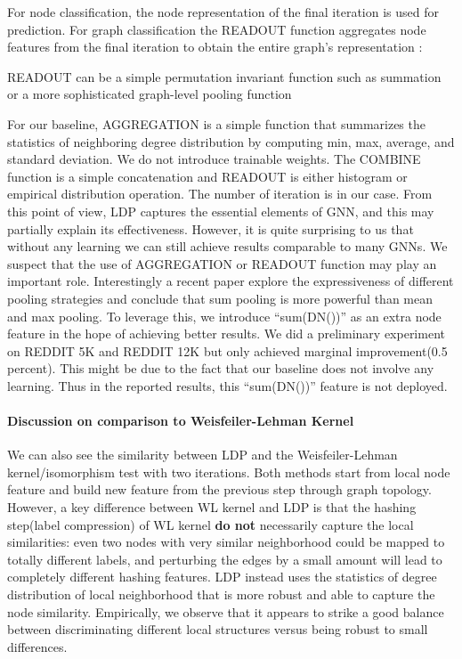 \documentclass[11pt,onecolumn]{article}
\newcommand{\DOM}       {{LDP}\xspace}
\begin{document}
For node classification, the node representation  of the final iteration is used for prediction. For graph classification the READOUT function aggregates node features from the final iteration to obtain the entire graph's representation : 

READOUT can be a simple permutation invariant function such as summation or a more sophisticated graph-level pooling function \cite{ying2018hierarchical, zhang2018end}

For our baseline, AGGREGATION is a simple function that summarizes the statistics of neighboring degree distribution by computing min, max, average, and standard deviation. We do not introduce trainable weights. The COMBINE function is a simple concatenation and READOUT is either histogram or empirical distribution operation. The number of iteration is  in our case. From this point of view, \DOM{} captures the essential elements of GNN, and this may partially explain its effectiveness. However, it is quite surprising to us that without any learning we can still achieve results comparable to many GNNs. We suspect that the use of AGGREGATION or READOUT function may play an important role. Interestingly a recent paper\cite{xu2018powerful} explore the expressiveness of different pooling strategies and conclude that sum pooling is more powerful than mean and max pooling. 
To leverage this, we introduce  ``sum(DN())'' as an extra node feature in the hope of achieving better results. We did a preliminary experiment on REDDIT 5K and REDDIT 12K but only achieved marginal improvement(0.5 percent). This might be due to the fact that our baseline does not involve any learning. Thus in the reported results, this ``sum(DN())'' feature is not deployed. 
 
\paragraph{Discussion on  comparison to Weisfeiler-Lehman Kernel}
We can also see the similarity between \DOM{} and the Weisfeiler-Lehman kernel/isomorphism test with two iterations.  Both methods start from local node feature and build new feature from the previous step through graph topology. However, a key difference between WL kernel and \DOM{} is that the hashing step(label compression) of WL kernel {\bf do not} necessarily capture the local similarities: even two nodes with very similar neighborhood could be mapped to totally different labels, and perturbing the edges by a small amount will lead to completely different hashing features. \DOM{} instead uses the statistics of degree distribution of local neighborhood that is more robust and able to capture the node similarity. Empirically, we observe that it appears to strike a good balance between discriminating different local structures versus being robust to small differences.
\end{document}
